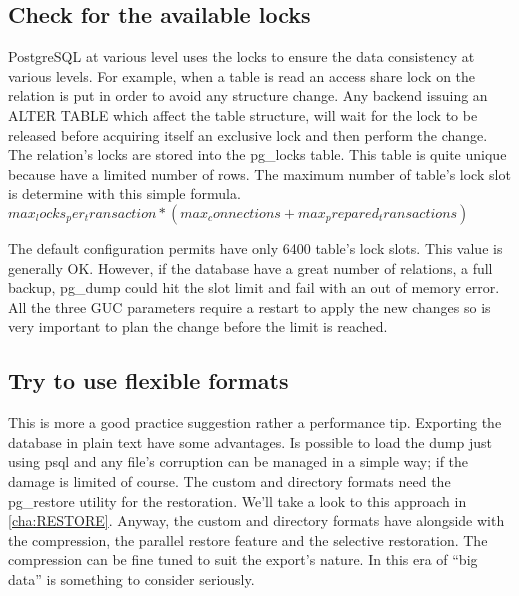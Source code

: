 \subsection{Check for the available locks}
PostgreSQL at various level uses the locks to ensure the data consistency at various levels. For 
example, when a table is read an access share lock on the relation is put in order to avoid any 
structure change. Any backend issuing an ALTER TABLE which affect the table structure, will wait 
for the lock to be released before acquiring itself an exclusive lock and then perform the change.
The relation's locks are stored into the pg\_locks table. This table is quite unique because have 
a limited number of rows. The maximum number of table's lock slot is determine with this simple 
formula.\newline
\begin{math}
 max_locks_per_transaction * (max_connections + max_prepared_transactions)
\end{math}\newline

The default configuration permits have only 6400 table's lock slots. This value is generally OK. 
However, if the database have a great number of relations, a full backup, pg\_dump could hit the 
slot limit and fail with an out of memory error.\newline
All the three GUC parameters require a restart to apply the new changes so is very important to 
plan the change before the limit is reached. 

\subsection{Try to use flexible formats}
This is more a good practice suggestion rather a performance tip. Exporting the database in plain 
text have some advantages. Is possible to load the dump just using psql and any file's corruption 
can be managed in a simple way; if the damage is limited of course. The custom and directory 
formats need the pg\_restore utility for the restoration. We'll take a look to this approach in 
\ref{cha:RESTORE}. Anyway, the custom and directory formats have alongside with the compression, 
the parallel restore feature and the selective restoration. The compression can be fine tuned to 
suit the export's nature. In this era of ``big data'' is something to consider seriously.


